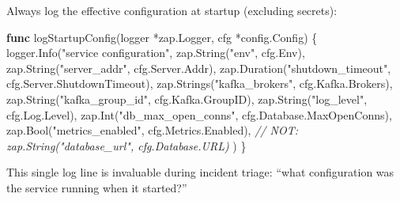\documentclass[
]{article}
\newenvironment{Shaded}{}{}
\newcommand{\CommentTok}[1]{\textcolor[rgb]{0.38,0.63,0.69}{\textit{#1}}}
\newcommand{\KeywordTok}[1]{\textcolor[rgb]{0.00,0.44,0.13}{\textbf{#1}}}
\newcommand{\NormalTok}[1]{#1}
\newcommand{\OperatorTok}[1]{\textcolor[rgb]{0.40,0.40,0.40}{#1}}
\newcommand{\StringTok}[1]{\textcolor[rgb]{0.25,0.44,0.63}{#1}}
\begin{document}
Always log the effective configuration at startup (excluding secrets):

\begin{Shaded}
\begin{Highlighting}[]
\KeywordTok{func}\NormalTok{ logStartupConfig}\OperatorTok{(}\NormalTok{logger }\OperatorTok{*}\NormalTok{zap}\OperatorTok{.}\NormalTok{Logger}\OperatorTok{,}\NormalTok{ cfg }\OperatorTok{*}\NormalTok{config}\OperatorTok{.}\NormalTok{Config}\OperatorTok{)} \OperatorTok{\{}
\NormalTok{    logger}\OperatorTok{.}\NormalTok{Info}\OperatorTok{(}\StringTok{"service configuration"}\OperatorTok{,}
\NormalTok{        zap}\OperatorTok{.}\NormalTok{String}\OperatorTok{(}\StringTok{"env"}\OperatorTok{,}\NormalTok{ cfg}\OperatorTok{.}\NormalTok{Env}\OperatorTok{),}
\NormalTok{        zap}\OperatorTok{.}\NormalTok{String}\OperatorTok{(}\StringTok{"server\_addr"}\OperatorTok{,}\NormalTok{ cfg}\OperatorTok{.}\NormalTok{Server}\OperatorTok{.}\NormalTok{Addr}\OperatorTok{),}
\NormalTok{        zap}\OperatorTok{.}\NormalTok{Duration}\OperatorTok{(}\StringTok{"shutdown\_timeout"}\OperatorTok{,}\NormalTok{ cfg}\OperatorTok{.}\NormalTok{Server}\OperatorTok{.}\NormalTok{ShutdownTimeout}\OperatorTok{),}
\NormalTok{        zap}\OperatorTok{.}\NormalTok{Strings}\OperatorTok{(}\StringTok{"kafka\_brokers"}\OperatorTok{,}\NormalTok{ cfg}\OperatorTok{.}\NormalTok{Kafka}\OperatorTok{.}\NormalTok{Brokers}\OperatorTok{),}
\NormalTok{        zap}\OperatorTok{.}\NormalTok{String}\OperatorTok{(}\StringTok{"kafka\_group\_id"}\OperatorTok{,}\NormalTok{ cfg}\OperatorTok{.}\NormalTok{Kafka}\OperatorTok{.}\NormalTok{GroupID}\OperatorTok{),}
\NormalTok{        zap}\OperatorTok{.}\NormalTok{String}\OperatorTok{(}\StringTok{"log\_level"}\OperatorTok{,}\NormalTok{ cfg}\OperatorTok{.}\NormalTok{Log}\OperatorTok{.}\NormalTok{Level}\OperatorTok{),}
\NormalTok{        zap}\OperatorTok{.}\NormalTok{Int}\OperatorTok{(}\StringTok{"db\_max\_open\_conns"}\OperatorTok{,}\NormalTok{ cfg}\OperatorTok{.}\NormalTok{Database}\OperatorTok{.}\NormalTok{MaxOpenConns}\OperatorTok{),}
\NormalTok{        zap}\OperatorTok{.}\NormalTok{Bool}\OperatorTok{(}\StringTok{"metrics\_enabled"}\OperatorTok{,}\NormalTok{ cfg}\OperatorTok{.}\NormalTok{Metrics}\OperatorTok{.}\NormalTok{Enabled}\OperatorTok{),}
        \CommentTok{// NOT: zap.String("database\_url", cfg.Database.URL)}
    \OperatorTok{)}
\OperatorTok{\}}
\end{Highlighting}
\end{Shaded}

This single log line is invaluable during incident triage: ``what
configuration was the service running when it started?''
\end{document}
